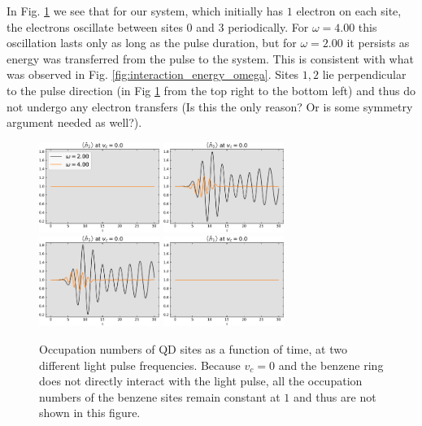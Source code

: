In Fig. \ref{fig:occupation_vc_00} we see that for our system, which initially has $1$ electron on each site, the electrons oscillate between sites $0$ and $3$ periodically. For $\omega=4.00$ this oscillation lasts only as long as the pulse duration, but for $\omega=2.00$ it persists as energy was transferred from the pulse to the system. This is consistent with what was observed in Fig. \ref{fig:interaction_energy_omega}. Sites $1, 2$ lie perpendicular to the pulse direction (in Fig \ref{fig:occupation_vc_00} from the top right to the bottom left) and thus do not undergo any electron transfers \color{red}(Is this the only reason? Or is some symmetry argument needed as well?)\color{black}.


\begin{figure}[!hbt]
    \centering
    \includegraphics[width=0.35\textwidth]{graph/occupation/occupation_site_2_vc_00.pdf}
    \includegraphics[width=0.35\textwidth]{graph/occupation/occupation_site_0_vc_00.pdf}
    \includegraphics[width=0.35\textwidth]{graph/occupation/occupation_site_3_vc_00.pdf}
    \includegraphics[width=0.35\textwidth]{graph/occupation/occupation_site_1_vc_00.pdf}
    \caption{Occupation numbers of QD sites as a function of time, at two different light pulse frequencies. Because $v_c=0$ and the benzene ring does not directly interact with the light pulse, all the occupation numbers of the benzene sites remain constant at $1$ and thus are not shown in this figure.}
    \label{fig:occupation_vc_00}
\end{figure}

